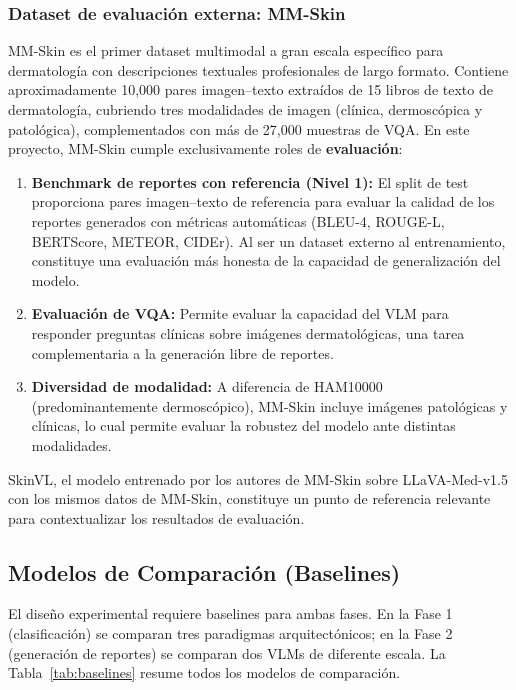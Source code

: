\documentclass[11pt, a4paper]{article}
\begin{document}
\subsubsection{Dataset de evaluación externa: MM-Skin}
\label{sec:mmskin}

MM-Skin \cite{zhao_mm-skin_2025} es el primer dataset multimodal a gran escala específico para dermatología con descripciones textuales profesionales de largo formato. Contiene aproximadamente 10,000 pares imagen--texto extraídos de 15 libros de texto de dermatología, cubriendo tres modalidades de imagen (clínica, dermoscópica y patológica), complementados con más de 27,000 muestras de VQA. En este proyecto, MM-Skin cumple exclusivamente roles de \textbf{evaluación}:

\begin{enumerate}
    \item \textbf{Benchmark de reportes con referencia (Nivel 1):} El split de test proporciona pares imagen--texto de referencia para evaluar la calidad de los reportes generados con métricas automáticas (BLEU-4, ROUGE-L, BERTScore, METEOR, CIDEr). Al ser un dataset externo al entrenamiento, constituye una evaluación más honesta de la capacidad de generalización del modelo.
    \item \textbf{Evaluación de VQA:} Permite evaluar la capacidad del VLM para responder preguntas clínicas sobre imágenes dermatológicas, una tarea complementaria a la generación libre de reportes.
    \item \textbf{Diversidad de modalidad:} A diferencia de HAM10000 (predominantemente dermoscópico), MM-Skin incluye imágenes patológicas y clínicas, lo cual permite evaluar la robustez del modelo ante distintas modalidades.
\end{enumerate}

SkinVL, el modelo entrenado por los autores de MM-Skin sobre LLaVA-Med-v1.5 con los mismos datos de MM-Skin, constituye un punto de referencia relevante para contextualizar los resultados de evaluación.

\subsection{Modelos de Comparación (Baselines)}

El diseño experimental requiere baselines para ambas fases. En la Fase 1 (clasificación) se comparan tres paradigmas arquitectónicos; en la Fase 2 (generación de reportes) se comparan dos VLMs de diferente escala. La Tabla~\ref{tab:baselines} resume todos los modelos de comparación.
\end{document}
